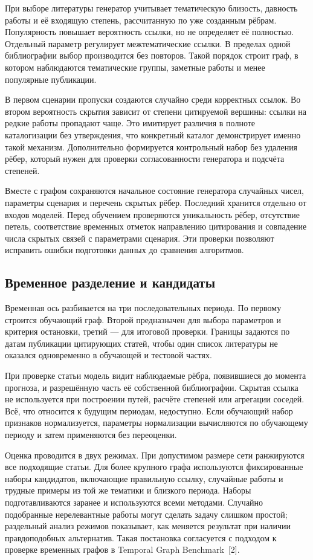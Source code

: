 \documentclass[a4paper,14pt,oneside]{extarticle}
\begin{document}
При выборе литературы генератор учитывает тематическую близость, давность работы и её входящую
степень, рассчитанную по уже созданным рёбрам. Популярность повышает вероятность ссылки,
но не определяет её полностью. Отдельный параметр регулирует межтематические ссылки.
В пределах одной библиографии выбор производится без повторов. Такой порядок строит граф,
в котором наблюдаются тематические группы, заметные работы и менее популярные публикации.

В первом сценарии пропуски создаются случайно среди корректных ссылок. Во втором вероятность
скрытия зависит от степени цитируемой вершины: ссылки на редкие работы пропадают чаще.
Это имитирует различия в полноте каталогизации без утверждения, что конкретный каталог
демонстрирует именно такой механизм. Дополнительно формируется контрольный набор без удаления
рёбер, который нужен для проверки согласованности генератора и подсчёта степеней.

Вместе с графом сохраняются начальное состояние генератора случайных чисел, параметры сценария
и перечень скрытых рёбер. Последний хранится отдельно от входов моделей. Перед обучением проверяются
уникальность рёбер, отсутствие петель, соответствие временных отметок направлению цитирования
и совпадение числа скрытых связей с параметрами сценария. Эти проверки позволяют исправить
ошибки подготовки данных до сравнения алгоритмов.

\clearpage
\subsection{Временное разделение и кандидаты}

Временная ось разбивается на три последовательных периода. По первому строится обучающий
граф. Второй предназначен для выбора параметров и критерия остановки, третий — для итоговой
проверки. Границы задаются по датам публикации цитирующих статей, чтобы один список литературы
не оказался одновременно в обучающей и тестовой частях.

При проверке статьи модель видит наблюдаемые рёбра, появившиеся до момента прогноза,
и разрешённую часть её собственной библиографии. Скрытая ссылка не используется при построении
путей, расчёте степеней или агрегации соседей. Всё, что относится к будущим периодам,
недоступно. Если обучающий набор признаков нормализуется, параметры нормализации вычисляются
по обучающему периоду и затем применяются без переоценки.

Оценка проводится в двух режимах. При допустимом размере сети ранжируются все подходящие статьи.
Для более крупного графа используются фиксированные наборы кандидатов, включающие правильную
ссылку, случайные работы и трудные примеры из той же тематики и близкого периода.
Наборы подготавливаются заранее и используются всеми методами. Случайно подобранные нерелевантные
работы могут сделать задачу слишком простой; раздельный анализ режимов показывает, как меняется
результат при наличии правдоподобных альтернатив. Такая постановка согласуется с подходом
к проверке временных графов в Temporal Graph Benchmark~[2].
\end{document}
